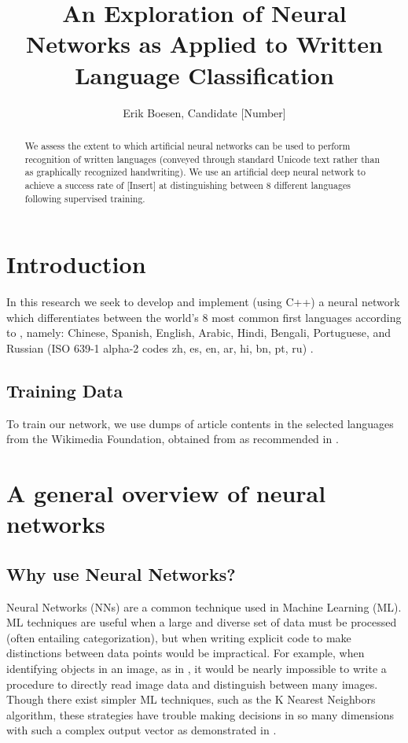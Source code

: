 \documentclass{article}
\begin{document}
\title{An Exploration of Neural Networks as Applied to Written Language Classification}
\author{Erik Boesen, Candidate [Number]}

\maketitle

\begin{abstract}
We assess the extent to which artificial neural networks can be used to perform recognition of written languages (conveyed through standard Unicode text rather than as graphically recognized handwriting). We use an artificial deep neural network to achieve a success rate of [Insert] at distinguishing between 8 different languages following supervised training.
\end{abstract}

\section{Introduction}
In this research we seek to develop and implement (using C++) a neural network which differentiates between the world's 8 most common first languages according to \cite{ethnologue}, namely: Chinese, Spanish, English, Arabic, Hindi, Bengali, Portuguese, and Russian (ISO 639-1 alpha-2 codes zh, es, en, ar, hi, bn, pt, ru) \cite{iso639}.

\subsection{Training Data}
To train our network, we use dumps of article contents in the selected languages from the Wikimedia Foundation, obtained from \cite{wikidumps} as recommended in \cite{langsamp}. %

\section{A general overview of neural networks}
\subsection{Why use Neural Networks?}
Neural Networks (NNs) are a common technique used in Machine Learning (ML). ML techniques are useful when a large and diverse set of data must be processed (often entailing categorization), but when writing explicit code to make distinctions between data points would be impractical. For example, when identifying objects in an image, as in \cite{hinton12}, it would be nearly impossible to write a procedure to directly read image data and distinguish between many images. Though there exist simpler ML techniques, such as the K Nearest Neighbors algorithm, these strategies have trouble making decisions in so many dimensions with such a complex output vector as demonstrated in \cite{knnic}.
\end{document}
